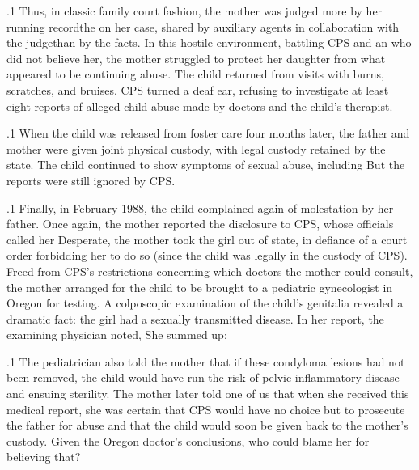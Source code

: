 \documentclass[11pt, twoside]{article}
\begin{document}
{\p.1{%
Thus, in classic family court fashion, the mother was judged more by
her running record\mdash{}the  on her case, shared by auxiliary
agents in collaboration with the judge\mdash{}than by the facts.
In this hostile environment, battling CPS and an  who did
not believe her, the mother struggled to protect her daughter from what
appeared to be continuing abuse. The child returned from visits with
burns, scratches, and bruises. CPS turned a deaf ear, refusing to investigate at least eight reports of alleged child abuse made by doctors and
the child's therapist.
}%

\p.1{%
When the child was released from foster care four months later, the
father and mother were given joint physical custody, with legal custody
retained by the state. The child continued to show symptoms of sexual
abuse, including  But the reports were still
ignored by CPS.
}%

\p.1{%
Finally, in February 1988, the child complained again of molestation
by her father. Once again, the mother reported the disclosure to CPS,
whose officials called her  Desperate, the mother took the
girl out of state, in defiance of a court order forbidding her to do so
(since the child was legally in the custody of CPS). Freed from CPS's
restrictions concerning which doctors the mother could consult, the
mother arranged for the child to be brought to a pediatric gynecologist
in Oregon for testing. A colposcopic examination of the child's genitalia revealed a dramatic fact: the girl had a sexually transmitted disease. In
her report, the examining physician noted,  She
summed up: 
}%

\p.1{%
The pediatrician also told the mother that if these condyloma lesions had not been removed, the child would have run the risk of pelvic
inflammatory disease and ensuing sterility.
The mother later told one of us that when she received this medical
report, she was certain that CPS would have no choice but to prosecute
the father for abuse and that the child would soon be given back to the
mother's custody. Given the Oregon doctor's conclusions, who could
blame her for believing that?
}%

}
\end{document}

